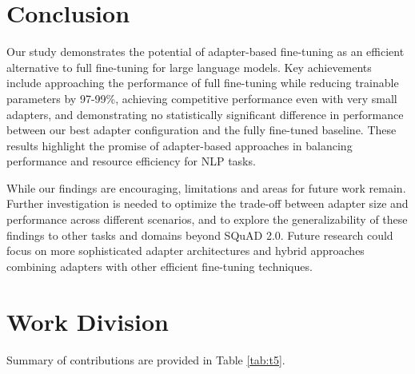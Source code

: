 \documentclass[conference]{IEEEtran}
\begin{document}
\section{Conclusion}

Our study demonstrates the potential of adapter-based fine-tuning as an efficient alternative to full fine-tuning for large language models. Key achievements include approaching the performance of full fine-tuning while reducing trainable parameters by 97-99\%, achieving competitive performance even with very small adapters, and demonstrating no statistically significant difference in performance between our best adapter configuration and the fully fine-tuned baseline. These results highlight the promise of adapter-based approaches in balancing performance and resource efficiency for NLP tasks.

While our findings are encouraging, limitations and areas for future work remain. Further investigation is needed to optimize the trade-off between adapter size and performance across different scenarios, and to explore the generalizability of these findings to other tasks and domains beyond SQuAD 2.0. Future research could focus on more sophisticated adapter architectures and hybrid approaches combining adapters with other efficient fine-tuning techniques.

\section{Work Division}

Summary of contributions are provided in Table \ref{tab:t5}.
\end{document}
